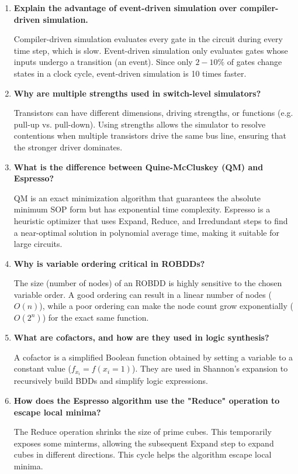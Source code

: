 \documentclass[12pt,a4paper]{article}
\newcommand{\Q}[1]{\textbf{#1}\par\noindent\ignorespaces}
\begin{document}
\begin{tcolorbox}[exambox, title={\textbf{Frequently Asked / Viva Questions}}]
\begin{enumerate}[leftmargin=*, topsep=0pt, label=\textbf{Q\arabic*.}, itemsep=6pt]
  \item \Q{Explain the advantage of event-driven simulation over compiler-driven simulation.}
        Compiler-driven simulation evaluates every gate in the circuit during every time step, which is slow. Event-driven simulation only evaluates gates whose inputs undergo a transition (an event). Since only $2-10\%$ of gates change states in a clock cycle, event-driven simulation is 10 times faster.
        
  \item \Q{Why are multiple strengths used in switch-level simulators?}
        Transistors can have different dimensions, driving strengths, or functions (e.g. pull-up vs. pull-down). Using strengths allows the simulator to resolve contentions when multiple transistors drive the same bus line, ensuring that the stronger driver dominates.
        
  \item \Q{What is the difference between Quine-McCluskey (QM) and Espresso?}
        QM is an exact minimization algorithm that guarantees the absolute minimum SOP form but has exponential time complexity. Espresso is a heuristic optimizer that uses Expand, Reduce, and Irredundant steps to find a near-optimal solution in polynomial average time, making it suitable for large circuits.
        
  \item \Q{Why is variable ordering critical in ROBDDs?}
        The size (number of nodes) of an ROBDD is highly sensitive to the chosen variable order. A good ordering can result in a linear number of nodes ($O(n)$), while a poor ordering can make the node count grow exponentially ($O(2^n)$) for the exact same function.
        
  \item \Q{What are cofactors, and how are they used in logic synthesis?}
        A cofactor is a simplified Boolean function obtained by setting a variable to a constant value ($f_{x_i} = f(x_i = 1)$). They are used in Shannon's expansion to recursively build BDDs and simplify logic expressions.
        
  \item \Q{How does the Espresso algorithm use the "Reduce" operation to escape local minima?}
        The Reduce operation shrinks the size of prime cubes. This temporarily exposes some minterms, allowing the subsequent Expand step to expand cubes in different directions. This cycle helps the algorithm escape local minima.
        

\end{enumerate}
\end{tcolorbox}
\end{document}
